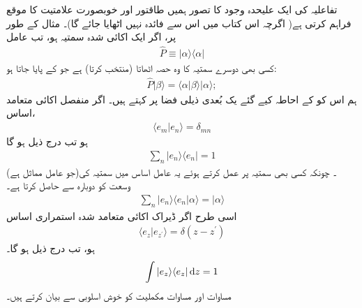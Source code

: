 تفاعلیہ کی ایک علیحدہ وجود کا تصور ہمیں طاقتور اور خوبصورت علامتیت کا موقع فراہم کرتی ہے( اگرچہ اس کتاب میں اس سے فائدہ نہیں اٹھایا جائے گا)۔ مثال کے طور پر، اگر  ایک اکائی شدہ سمتیہ ہو، تب عامل 
\begin{align}
\hat{P} \equiv | \alpha \rangle \langle \alpha | 
\end{align}
کسی بھی دوسرے سمتیہ کا وہ حصہ اٹھاتا (منتخب کرتا) ہے جو  کے پایا جاتا ہو:
\begin{align*}
\hat{P} | \beta \rangle = \langle \alpha | \beta \rangle | \alpha \rangle ;
\end{align*}
ہم اس کو  کے احاطہ کیے گئے یک بُعدی ذیلی فضا پر  کہتے ہیں۔ اگر  منفصل اکائی متعامد اساس،
\begin{align}
\langle e_{m} | e_{n} \rangle = \delta_{mn}
\end{align}
ہو تب درج ذیل ہو گا 
\begin{align}\label{مساوات_قواعد_مکملیت_الف}
\sum_{n} | e_{n} \rangle \langle e_{n} | = 1 
\end{align}
(جو عامل مماثل ہے)۔ چونکہ کسی بھی سمتیہ  پر عمل کرتے ہوئے یہ عامل اساس میں سمتیہ  کی وسعت کو دوبارہ سے حاصل کرتا ہے۔ 
\begin{align}
\sum_{n} | e_{n} \rangle \langle e_{n} | \alpha \rangle = | \alpha \rangle 
\end{align}
اسی طرح اگر  ڈیراک اکائی متعامد شدہ استمراری اساس 
\begin{align}
\langle e_{z} | e_{z^{'}} \rangle = \delta ( z-z^{'})
\end{align}
ہو، تب درج ذیل ہو گا۔ 
\begin{align}\label{مساوات_قواعد_مکملیت_ب}
\int | e_{z} \rangle \langle e_{z} | \dif z = 1
\end{align}
 مساوات  اور مساوات  مکملیت کو خوش اسلوبی سے بیان کرتے ہیں۔
 
